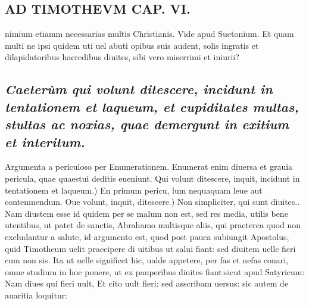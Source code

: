 \documentclass{article}
\begin{document}
\begin{pages}
\section*{AD TIMOTHEVM CAP. VI. }
\marginpar{[ p.125 ]}\pstart nimium etiamm necessarias multis Christianis. Vide apud Suetonium. Et quam multi ne ipsi quidem uti uel abuti opibus suis audent, solis ingratis et dilapidatoribus haeredibus diuites, sibi vero miserrimi et iniurii?  \pend
{}
{}
\subsection*{\textit{Caeterùm qui volunt ditescere, incidunt in tentationem et laqueum, et cupiditates multas, stultas ac noxias, quae demergunt in exitium et interitum. }}\pstart Argumenta a periculoso per Enumerationem. Enumerat enim diuersa et grauia pericula, quae quaestui deditis eueniunt.  \pend\pstart Qui volunt ditescere, inquit, incidunt in tentationem et laqueum.) En primum pericu, lum nequaquam leue aut contemnendum.  \pend\pstart Oue volunt, inquit, ditescere.) Non simpliciter, qui sunt diuites.. Nam diustem esse id quidem per se malum non est, sed res media, utilis bene utentibus, ut patet de sanctis, Abrahamo multisque aliis, qui praeterea quod non excludantur a salute, id argumento est, quod post pauca subiungit Apostolus, quid Timotheum uelit praecipere di uitibus ut salui fiant: sed diuitem uelle fieri cum non sis. Ita ut uelle significet hic, ualde appetere, per fas et nefas conari, omne studium in hoc ponere, ut ex pauperibus diuites fiant:sicut apud Satyricum: Nam diues qui fieri uult, Et cito uult fieri: sed asscribam uersus: sic autem de auaritia loquitur:  \pend
{}
{}

\end{pages}
\end{document}
